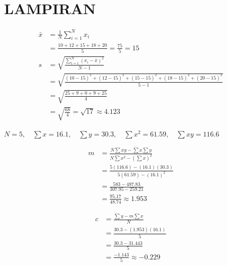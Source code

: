 \chapter*{LAMPIRAN}

\begin{align*}
\bar{x} &= \frac{1}{N} \sum_{i=1}^{N} x_i \\
&= \frac{10 + 12 + 15 + 18 + 20}{5} = \frac{75}{5} = 15 \\
s &= \sqrt{\frac{\sum_{i=1}^{N} (x_i - \bar{x})^2}{N-1}} \\
&= \sqrt{\frac{(10-15)^2 + (12-15)^2 + (15-15)^2 + (18-15)^2 + (20-15)^2}{5-1}} \\
&= \sqrt{\frac{25 + 9 + 0 + 9 + 25}{4}} \\
&= \sqrt{\frac{68}{4}} = \sqrt{17} \approx 4.123
\end{align*}


$N = 5, \quad \sum x = 16.1, \quad \sum y = 30.3, \quad \sum x^2 = 61.59, \quad \sum xy = 116.6$

\noindent
\begin{minipage}[t]{0.55\textwidth}
\begin{align*}
m &= \frac{N \sum xy - \sum x \sum y}{N \sum x^2 - (\sum x)^2} \\
&= \frac{5(116.6) - (16.1)(30.3)}{5(61.59) - (16.1)^2} \\
&= \frac{583 - 487.83}{307.95 - 259.21} \\
&= \frac{95.17}{48.74} \approx 1.953
\end{align*}
\end{minipage}%
\begin{minipage}[t]{0.45\textwidth}
\begin{align*}
c &= \frac{\sum y - m \sum x}{N} \\
&= \frac{30.3 - (1.953)(16.1)}{5} \\
&= \frac{30.3 - 31.443}{5} \\
&= \frac{-1.143}{5} \approx -0.229
\end{align*}
\end{minipage}
